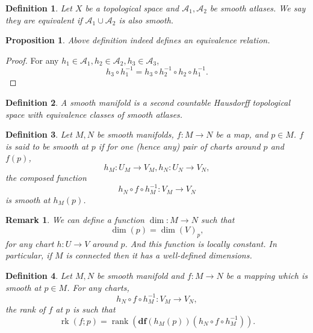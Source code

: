 \documentclass{article}
\newtheorem{proposition}{Proposition}[section]
\newtheorem{definition}{Definition}[section]
\newtheorem{remark}{Remark}[section]
\numberwithin{equation}{section}
\DeclareMathOperator{\rk}{rk}
\DeclareMathOperator{\rank}{rank}
\begin{document}
\begin{definition}
Let $X$ be a topological space and $\mathcal{A}_1,\mathcal{A}_2$ be smooth atlases. We say they are equivalent if $\mathcal{A}_1\cup\mathcal{A}_2$ is also smooth.
\end{definition}

\begin{proposition}
Above definition indeed defines an equivalence relation.
\end{proposition}
\begin{proof}
For any $h_1\in \mathcal{A}_1,h_2\in \mathcal{A}_2,h_3\in \mathcal{A}_3$, 
\begin{equation*}
h_3\circ h^{-1}_1 = h_3\circ h^{-1}_2\circ h_2\circ h^{-1}_1.
\end{equation*}
\end{proof}



\begin{definition}
A smooth manifold is a second countable Hausdorff topological space with equivalence classes of smooth atlases.
\end{definition}

\begin{definition}
Let $M,N$ be smooth manifolds, $f:M\to N$ be a map, and $p\in M$. $f$ is said to be smooth at $p$ if for one (hence any) pair of charts around $p$ and $f(p)$, 
\begin{equation*}
h_M:U_M\to V_M, h_N:U_N\to V_N,
\end{equation*}
the composed function 
\begin{equation*}
h_N\circ f \circ h_M^{-1}:V_M\to V_N
\end{equation*}
is smooth at $h_M(p)$.
\end{definition}

\begin{remark}
We can define a function $\dim:M\to N$ such that
\begin{equation*}
\dim(p)=\dim(V)_p,
\end{equation*}
for any chart $h:U\to V$ around $p$. And this function is locally constant. In particular, if $M$ is connected then it has a well-defined dimensions.
\end{remark}

\begin{definition}
Let $M,N$ be smooth manifold and $f:M\to N$ be a mapping which is smooth at $p\in M$. For any charts, 
\begin{equation*}
h_N\circ f \circ h_M^{-1}:V_M\to V_N,
\end{equation*}
the rank of $f$ at $p$ is such that
\begin{equation*}
\rk(f;p) = \rank(\mathbf{df}(h_M(p))(h_N\circ f\circ h^{-1}_M)).
\end{equation*}
\end{definition}
\end{document}
